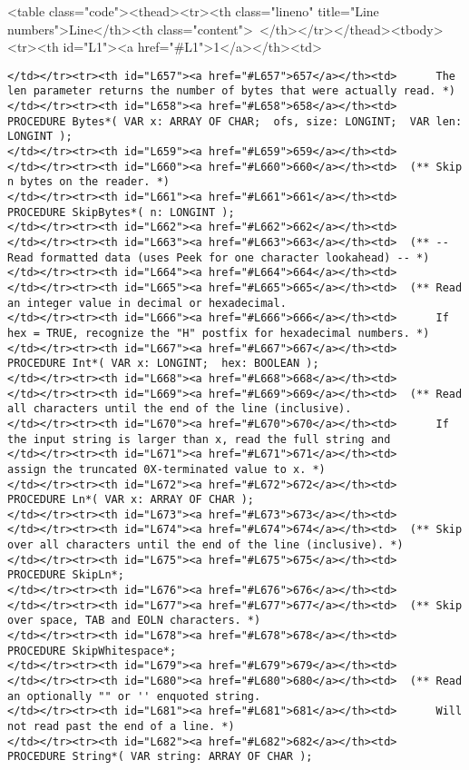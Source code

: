 <table class="code"><thead><tr><th class="lineno" title="Line numbers">Line</th><th class="content"> </th></tr></thead><tbody><tr><th id="L1"><a href="#L1">1</a></th><td>\documentclass[a4paper,11pt]{article}
\begin{document}
\begin{lstlisting}[language=Oberon,frame=none,caption={Simplified Reader and Writer Interface}]
</td></tr><tr><th id="L657"><a href="#L657">657</a></th><td>      The len parameter returns the number of bytes that were actually read. *)
</td></tr><tr><th id="L658"><a href="#L658">658</a></th><td>  PROCEDURE Bytes*( VAR x: ARRAY OF CHAR;  ofs, size: LONGINT;  VAR len: LONGINT );
</td></tr><tr><th id="L659"><a href="#L659">659</a></th><td>
</td></tr><tr><th id="L660"><a href="#L660">660</a></th><td>  (** Skip n bytes on the reader. *)
</td></tr><tr><th id="L661"><a href="#L661">661</a></th><td>  PROCEDURE SkipBytes*( n: LONGINT );
</td></tr><tr><th id="L662"><a href="#L662">662</a></th><td>
</td></tr><tr><th id="L663"><a href="#L663">663</a></th><td>  (** -- Read formatted data (uses Peek for one character lookahead) -- *)
</td></tr><tr><th id="L664"><a href="#L664">664</a></th><td>
</td></tr><tr><th id="L665"><a href="#L665">665</a></th><td>  (** Read an integer value in decimal or hexadecimal.
</td></tr><tr><th id="L666"><a href="#L666">666</a></th><td>      If hex = TRUE, recognize the "H" postfix for hexadecimal numbers. *)
</td></tr><tr><th id="L667"><a href="#L667">667</a></th><td>  PROCEDURE Int*( VAR x: LONGINT;  hex: BOOLEAN );
</td></tr><tr><th id="L668"><a href="#L668">668</a></th><td>
</td></tr><tr><th id="L669"><a href="#L669">669</a></th><td>  (** Read all characters until the end of the line (inclusive).
</td></tr><tr><th id="L670"><a href="#L670">670</a></th><td>      If the input string is larger than x, read the full string and
</td></tr><tr><th id="L671"><a href="#L671">671</a></th><td>      assign the truncated 0X-terminated value to x. *)
</td></tr><tr><th id="L672"><a href="#L672">672</a></th><td>  PROCEDURE Ln*( VAR x: ARRAY OF CHAR );
</td></tr><tr><th id="L673"><a href="#L673">673</a></th><td>
</td></tr><tr><th id="L674"><a href="#L674">674</a></th><td>  (** Skip over all characters until the end of the line (inclusive). *)
</td></tr><tr><th id="L675"><a href="#L675">675</a></th><td>  PROCEDURE SkipLn*;
</td></tr><tr><th id="L676"><a href="#L676">676</a></th><td>
</td></tr><tr><th id="L677"><a href="#L677">677</a></th><td>  (** Skip over space, TAB and EOLN characters. *)
</td></tr><tr><th id="L678"><a href="#L678">678</a></th><td>  PROCEDURE SkipWhitespace*;
</td></tr><tr><th id="L679"><a href="#L679">679</a></th><td>
</td></tr><tr><th id="L680"><a href="#L680">680</a></th><td>  (** Read an optionally "" or '' enquoted string.
</td></tr><tr><th id="L681"><a href="#L681">681</a></th><td>      Will not read past the end of a line. *)
</td></tr><tr><th id="L682"><a href="#L682">682</a></th><td>  PROCEDURE String*( VAR string: ARRAY OF CHAR );

\end{lstlisting}
\end{document}
